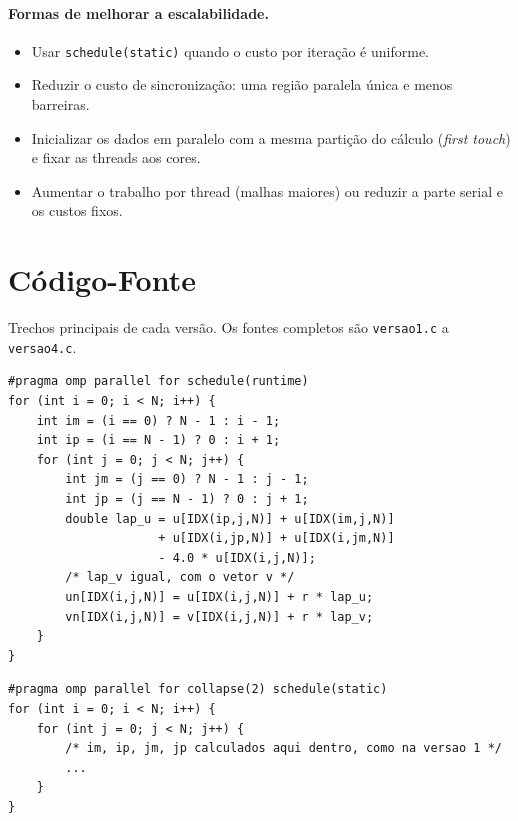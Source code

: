 \documentclass[a4paper,12pt]{article}
\begin{document}
\paragraph{Formas de melhorar a escalabilidade.}
\begin{itemize}
    \item Usar \texttt{schedule(static)} quando o custo por iteração é uniforme.
    \item Reduzir o custo de sincronização: uma região paralela única e menos
          barreiras.
    \item Inicializar os dados em paralelo com a mesma partição do cálculo
          (\emph{first touch}) e fixar as threads aos cores.
    \item Aumentar o trabalho por thread (malhas maiores) ou reduzir a parte
          serial e os custos fixos.
\end{itemize}

\newpage
\appendix

\section{Código-Fonte}

Trechos principais de cada versão. Os fontes completos são
\texttt{versao1.c} a \texttt{versao4.c}.

\begin{lstlisting}[style=cstyle, caption={Versão 1: laço externo com \texttt{schedule(runtime)}.}]
#pragma omp parallel for schedule(runtime)
for (int i = 0; i < N; i++) {
    int im = (i == 0) ? N - 1 : i - 1;
    int ip = (i == N - 1) ? 0 : i + 1;
    for (int j = 0; j < N; j++) {
        int jm = (j == 0) ? N - 1 : j - 1;
        int jp = (j == N - 1) ? 0 : j + 1;
        double lap_u = u[IDX(ip,j,N)] + u[IDX(im,j,N)]
                     + u[IDX(i,jp,N)] + u[IDX(i,jm,N)]
                     - 4.0 * u[IDX(i,j,N)];
        /* lap_v igual, com o vetor v */
        un[IDX(i,j,N)] = u[IDX(i,j,N)] + r * lap_u;
        vn[IDX(i,j,N)] = v[IDX(i,j,N)] + r * lap_v;
    }
}
\end{lstlisting}

\begin{lstlisting}[style=cstyle, caption={Versão 2: \texttt{collapse(2)} com \texttt{static}.}]
#pragma omp parallel for collapse(2) schedule(static)
for (int i = 0; i < N; i++) {
    for (int j = 0; j < N; j++) {
        /* im, ip, jm, jp calculados aqui dentro, como na versao 1 */
        ...
    }
}
\end{lstlisting}
\end{document}
